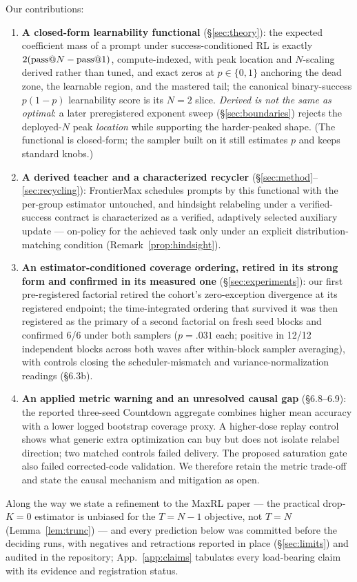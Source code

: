 Our contributions:
\begin{enumerate}
\item \textbf{A closed-form learnability functional}
  (\S\ref{sec:theory}): the expected coefficient mass of a prompt
  under success-conditioned RL is exactly $2(\text{pass@}N-\text{pass@}1)$,
  compute-indexed, with peak location and $N$-scaling derived rather
  than tuned, and exact zeros at $p\in\{0,1\}$ anchoring the dead
  zone, the learnable region, and the mastered tail; the canonical
  binary-success $p(1-p)$ learnability score is its $N{=}2$ slice.
  \emph{Derived is not the same as optimal}: a later preregistered
  exponent sweep (\S\ref{sec:boundaries}) rejects the deployed-$N$ peak
  \emph{location} while supporting the harder-peaked shape. (The functional is
  closed-form; the sampler built on it still estimates $p$ and keeps
  standard knobs.)
\item \textbf{A derived teacher and a characterized recycler}
  (\S\ref{sec:method}--\ref{sec:recycling}): FrontierMax schedules
  prompts by this functional with the per-group estimator untouched,
  and hindsight relabeling under a verified-success contract is
  characterized as a verified, adaptively selected auxiliary update
  --- on-policy for the achieved task only under an explicit
  distribution-matching condition (Remark~\ref{prop:hindsight}).
\item \textbf{An estimator-conditioned coverage ordering, retired in
  its strong form and confirmed in its measured one}
  (\S\ref{sec:experiments}): our first pre-registered factorial
  retired the cohort's zero-exception divergence at its registered
  endpoint; the time-integrated ordering that survived it was then
  registered as the primary of a second factorial on fresh seed
  blocks and confirmed 6/6 under both samplers ($p{=}.031$ each;
  positive in 12/12 independent blocks across both waves after
  within-block sampler averaging), with controls closing the
  scheduler-mismatch and variance-normalization readings (\S 6.3b).
\item \textbf{An applied metric warning and an unresolved causal gap}
  (\S 6.8--6.9): the reported three-seed Countdown aggregate combines
  higher mean accuracy with a lower logged bootstrap coverage proxy.
  A higher-dose replay control shows what generic extra optimization can
  buy but does not isolate relabel direction; two matched controls failed
  delivery. The proposed saturation gate also failed corrected-code
  validation. We therefore retain the metric trade-off and state the
  causal mechanism and mitigation as open.
\end{enumerate}
Along the way we state a refinement to the MaxRL paper --- the practical
drop-$K{=}0$ estimator is unbiased for the $T{=}N{-}1$ objective, not
$T{=}N$ (Lemma~\ref{lem:trunc}) --- and every prediction below was
committed before the deciding runs, with negatives and retractions
reported in place (\S\ref{sec:limits}) and audited in the repository;
App.~\ref{app:claims} tabulates every load-bearing claim with its
evidence and registration status.


